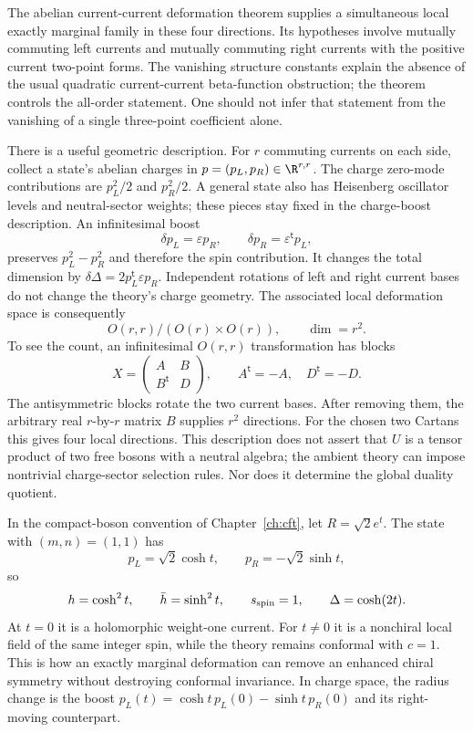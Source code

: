 The abelian current-current deformation theorem supplies a
simultaneous local exactly marginal family in these four
directions. Its hypotheses involve mutually commuting left
currents and mutually commuting right currents with the
positive current two-point forms. The vanishing structure
constants explain the absence of the usual quadratic
current-current beta-function obstruction; the theorem controls
the all-order statement. One should not infer that statement
from the vanishing of a single three-point coefficient alone.

There is a useful geometric description. For $r$ commuting
currents on each side, collect a state's abelian charges in
$p=(p_L,p_R)\in\R^{r,r}$. The charge zero-mode contributions
are $p_L^2/2$ and $p_R^2/2$. A general state also has
Heisenberg oscillator levels and neutral-sector weights; these
pieces stay fixed in the charge-boost description.
An infinitesimal boost
\begin{equation}
 \delta p_L=\varepsilon p_R,\qquad
 \delta p_R=\varepsilon^{\mathsf t}p_L,
 \label{eq:full-charge-boost}
\end{equation}
preserves $p_L^2-p_R^2$ and therefore the spin contribution.
It changes the total dimension by
$\delta\Delta=2p_L^{\mathsf t}\varepsilon p_R$.
Independent rotations of left and right current bases do not
change the theory's charge geometry. The associated local
deformation space is consequently
\[
 O(r,r)/(O(r)\times O(r)),
 \qquad\dim=r^2.
\]
To see the count, an infinitesimal $O(r,r)$ transformation has blocks
\[
 X=\begin{pmatrix}A&B\\B^{\mathsf t}&D\end{pmatrix},
 \qquad A^{\mathsf t}=-A,\quad D^{\mathsf t}=-D.
\]
The antisymmetric blocks rotate the two current bases. After removing
them, the arbitrary real $r$-by-$r$ matrix $B$ supplies $r^2$ directions.
For the chosen two Cartans this gives four local directions.
This description does not assert that $U$ is a tensor product
of two free bosons with a neutral algebra; the ambient theory
can impose nontrivial charge-sector selection rules.
Nor does it determine the global duality quotient.

\begin{example}
In the compact-boson convention of Chapter~\ref{ch:cft},
let $R=\sqrt2e^t$. The state with $(m,n)=(1,1)$ has
\[
 p_L=\sqrt2\cosh t,\qquad p_R=-\sqrt2\sinh t,
\]
so
\[
 h=\cosh^2t,\qquad \bar h=\sinh^2t,\qquad
 s_{\rm spin}=1,\qquad\Delta=\cosh(2t).
\]
At $t=0$ it is a holomorphic weight-one current. For $t\ne0$
it is a nonchiral local field of the same integer spin, while
the theory remains conformal with $c=1$. This is how an exactly
marginal deformation can remove an enhanced chiral symmetry
without destroying conformal invariance. In charge space,
the radius change is the boost
$p_L(t)=\cosh t\,p_L(0)-\sinh t\,p_R(0)$ and its
right-moving counterpart.
\end{example}

